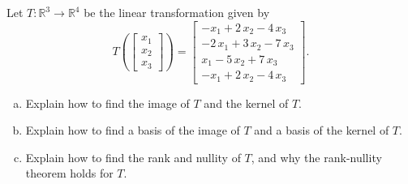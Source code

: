 
\begin{exerciseStatement}
 Let \(T:\mathbb{R}^ 3  \to \mathbb{R}^ 4 \) be the linear transformation given by \[T\left(  \left[\begin{array}{c}
x_{1} \\
x_{2} \\
x_{3}
\end{array}\right]  \right) =  \left[\begin{array}{c}
-x_{1} + 2 \, x_{2} - 4 \, x_{3} \\
-2 \, x_{1} + 3 \, x_{2} - 7 \, x_{3} \\
x_{1} - 5 \, x_{2} + 7 \, x_{3} \\
-x_{1} + 2 \, x_{2} - 4 \, x_{3}
\end{array}\right] .\]
\begin{enumerate}[(a)]
\item Explain how to find the image of \(T\) and the kernel of \(T\).
\item Explain how to find a basis of the image of \(T\) and a basis of the kernel of \(T\).
\item Explain how to find the rank and nullity of \(T\), and why the rank-nullity theorem holds for \(T\).
\end{enumerate}
    
\end{exerciseStatement}
    

